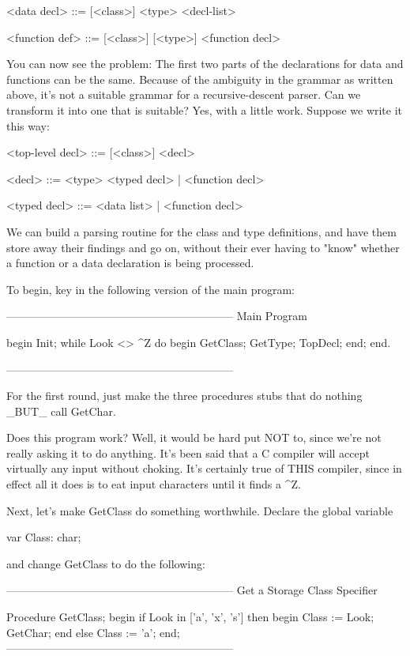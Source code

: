 \documentclass[float=false, crop=false]{standalone}
\begin{document}
     <data decl> ::= [<class>] <type> <decl-list>

     <function def> ::= [<class>] [<type>] <function decl>


You  can  now  see the problem:   The  first  two  parts  of  the
declarations for data and functions can be the same.   Because of
the  ambiguity  in  the grammar as  written  above,  it's  not  a
suitable  grammar  for  a  recursive-descent  parser.     Can  we
transform it into one that is suitable?  Yes, with a little work.
Suppose we write it this way:


     <top-level decl> ::= [<class>] <decl>

     <decl> ::= <type> <typed decl> | <function decl>

     <typed decl> ::= <data list> | <function decl>


We can build a parsing routine for the class and type definitions, and have them
store away their findings and go on, without their ever having to "know" whether
a function or a data declaration is being processed.

To begin, key in the following version of the main program:

\begin{code}
{--------------------------------------------------------------}
{ Main Program }

begin
   Init;
   while Look <> ^Z do begin
      GetClass;
      GetType;
      TopDecl;
   end;
end.

{--------------------------------------------------------------}
\end{code}

For the first round, just make the three procedures stubs that do nothing _BUT_
call GetChar.

Does this program work? Well, it would be hard put NOT to, since we're not
really asking it to do anything. It's been said that a C compiler will accept
virtually any input without choking. It's certainly true of THIS compiler, since
in effect all it does is to eat input characters until it finds a ^Z.

Next, let's make GetClass do something worthwhile. Declare the global variable


     var Class: char;


and change GetClass to do the following:

\begin{code}
{--------------------------------------------------------------}
{  Get a Storage Class Specifier }

Procedure GetClass;
begin
   if Look in ['a', 'x', 's'] then begin
      Class := Look;
      GetChar;
      end
   else Class := 'a';
end;
{--------------------------------------------------------------}
\end{code}
\end{document}
